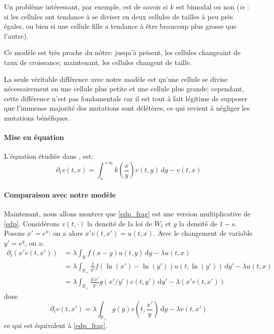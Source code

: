 \documentclass[12pt]{article}
\newcommand{\pth}[1]{\left(#1\right)}
\newcommand{\ie}{\emph{ie} }
\newcommand{\de}{\,\mathrm{d}}
\newcommand{\Er}{\mathbb{R}}
\newcommand{\dr}{\partial}
\begin{document}
Un problème intéressant, par exemple, est de savoir si $k$ est bimodal ou non (\ie: si les cellules ont tendance à se diviser en deux cellules de tailles à peu près égales, ou bien si une cellule fille a tendance à être beaucoup plus grosse que l'autre).

Ce modèle est très proche du nôtre: jusqu'à présent, les cellules changeaint de taux de croissance; maintenant, les cellules changent de taille.

La seule véritable différence avec notre modèle est qu'une cellule se divise nécessairement en une cellule plus petite et une cellule plus grande; cependant, cette différence n'est pas fondamentale car il est tout à fait légitime de supposer que l'immense majorité des mutations sont délétères, ce qui revient à négliger les mutations bénéfiques.

\paragraph{Mise en équation} 

L'équation étudiée dans \cite{md1}, \cite{md2} est:
\begin{equation}\label{edp_frag}
\dr_tv(t,x)=\int_x^{+\infty}k\pth{\frac{x}{y}}v(t,y)\de y-v(t,x)
\end{equation}


\paragraph{Comparaison avec notre modèle}

Maintenant, nous allons montrer que \eqref{edp_frag} est une version multiplicative de \eqref{edp}.  Considérons $v(t,\cdot)$ la densité de la loi de $W_t$ et $g$ la densité de $1-s$. Posons $x'=e^x$: on a alors $x'v(t,x')=u(t,x)$. Avec le changement de variable $y'=e^y$, on a:
\begin{align*}
  \dr_t(x'v(t,x'))
  &=\lambda\int_{\Er}f(x-y)u(t,y)\de y-\lambda u(t,x)\\
  &=\lambda\int_{\Er_+}\frac{1}{y'}f(\ln(x')-\ln(y'))u(t,\ln(y'))\de y'-\lambda u(t,x)\\
  &=\lambda\int_{\Er_+}\frac{y'x'}{y'}g(x'/y')v\pth{t,y'}\de y'-\lambda\pth{x'v(t,x')}
\end{align*}
donc 
\[\dr_tv(t,x')=\lambda\int_{\Er_+}g(y)v\pth{t,\frac{x'}{y}}\de y-\lambda v(t,x')\]
ce qui est équivalent à \eqref{edp_frag}.
\end{document}
